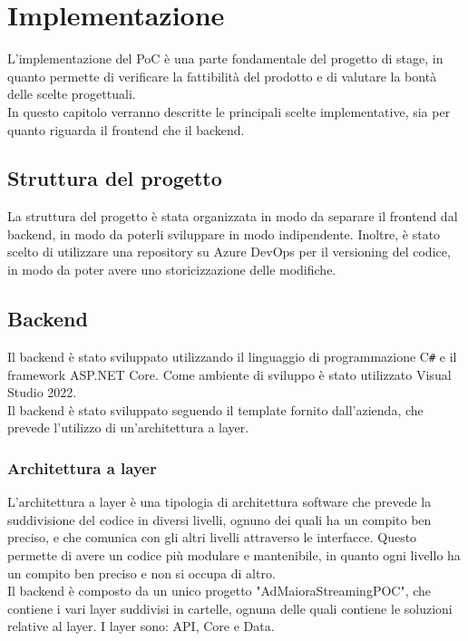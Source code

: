 \chapter{Implementazione}
\label{cap:implementazione}

L'implementazione del PoC è una parte fondamentale del progetto di stage, in quanto permette di verificare la fattibilità del prodotto e di valutare la bontà delle scelte progettuali.\\
In questo capitolo verranno descritte le principali scelte implementative, sia per quanto riguarda il frontend che il backend.\\

\section{Struttura del progetto}
La struttura del progetto è stata organizzata in modo da separare il frontend dal backend, in modo da poterli sviluppare in modo indipendente. Inoltre, è stato scelto di utilizzare una repository su Azure DevOps per il versioning del codice, in modo da poter avere uno storicizzazione delle modifiche.
\section{Backend}
Il backend è stato sviluppato utilizzando il linguaggio di programmazione C\texttt{\#} e il framework ASP.NET Core. 
Come ambiente di sviluppo è stato utilizzato Visual Studio 2022.\\
Il backend è stato sviluppato seguendo il template fornito dall'azienda, che prevede l'utilizzo di un'architettura a layer.\\
\subsection{Architettura a layer}
L'architettura a layer è una tipologia di architettura software che prevede la suddivisione del codice in diversi livelli, ognuno dei quali ha un compito ben preciso, e che comunica con gli altri livelli attraverso le interfacce. Questo permette di avere un codice più modulare e mantenibile, in quanto ogni livello ha un compito ben preciso e non si occupa di altro.\\
Il backend è composto da un unico progetto "AdMaioraStreamingPOC", che contiene i vari layer suddivisi in cartelle, ognuna delle quali contiene le soluzioni relative al layer. I layer sono: API, Core e Data.\\

